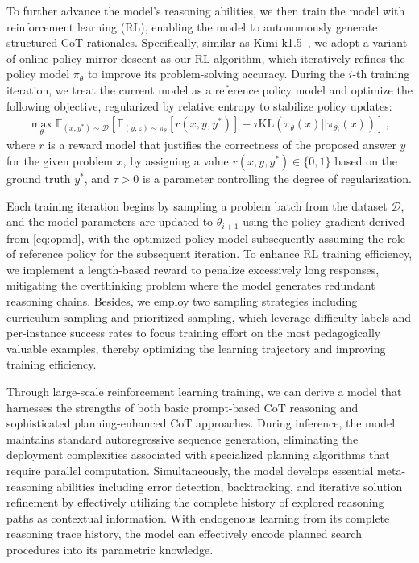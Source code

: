 \documentclass{article}
\newcommand{\citep}[1]{\parencite{#1}}
\begin{document}
To further advance the model’s reasoning abilities, we then train the model with reinforcement learning (RL), enabling the model to autonomously generate structured CoT rationales.
Specifically, similar as Kimi k1.5~\citep{team2025kimi}, we adopt a variant of online policy mirror descent as our RL algorithm, which iteratively refines the policy model $\pi_\theta$ to improve its problem-solving accuracy.
During the $i$-th training iteration, we treat the current model as a reference policy model and optimize the following objective, regularized by relative entropy to stabilize policy updates:
\begin{align}
\max_\theta \mathbb{E}_{(x, y^*)\sim\mathcal{D}}\left[ \mathbb{E}_{(y, z)\sim\pi_\theta} \left[r(x, y, y^*)\right] - \tau \mathrm{KL} (\pi_{\theta}(x) || \pi_{\theta_i}(x))  \right]\, ,
\label{eq:opmd}
\end{align}
where $r$ is a reward model that justifies the correctness of the proposed answer $y$ for the given problem $x$, by assigning a value $r(x, y, y^*)\in \{0,1\}$ based on the ground truth $y^*$, and  $\tau > 0$ is a parameter controlling the degree of regularization. 



Each training iteration begins by sampling a problem batch from the dataset $\mathcal{D}$, and the model parameters are updated to $\theta_{i+1}$ using the policy gradient derived from \eqref{eq:opmd}, with the optimized policy model subsequently assuming the role of reference policy for the subsequent iteration.
To enhance RL training efficiency, we implement a length-based reward to penalize excessively long responses, mitigating the overthinking problem where the model generates redundant reasoning chains.
Besides, we employ two sampling strategies including curriculum sampling and prioritized sampling, which leverage difficulty labels and per-instance success rates to focus training effort on the most pedagogically valuable examples, thereby optimizing the learning trajectory and improving training efficiency.




Through large-scale reinforcement learning training, we can derive a model that harnesses the strengths of both basic prompt-based CoT reasoning and sophisticated planning-enhanced CoT approaches. During inference, the model maintains standard autoregressive sequence generation, eliminating the deployment complexities associated with specialized planning algorithms that require parallel computation.
Simultaneously, the model develops essential meta-reasoning abilities including error detection, backtracking, and iterative solution refinement by effectively utilizing the complete history of explored reasoning paths as contextual information.
With endogenous learning from its complete reasoning trace history, the model can effectively encode planned search procedures into its parametric knowledge.
\end{document}
